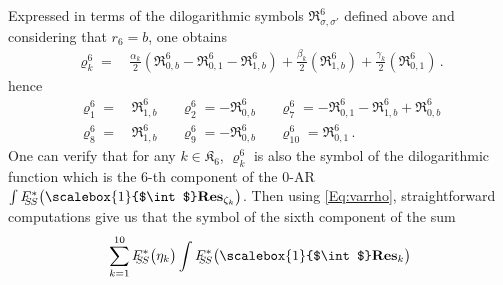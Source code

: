 \documentclass[11pt]{amsart}
\begin{document}
Expressed in terms of the 
dilogarithmic symbols $\mathfrak R^6_{\sigma,\sigma'}$ defined above and considering that $r_6=b$,  one obtains 
\begin{align*}%
\varrho_k^6 = &\, \frac{\alpha_k}{2} \left(
{\mathfrak R}^6_{0,b}
-{\mathfrak R}^6_{0,1}-{\mathfrak R}^6_{1,b}
\right) 
 +
 \frac{\beta_k}{2}  \left(
{\mathfrak R}^6_{1,b}
\right)+
 \frac{\gamma_k}{2}
 \left( 
{\mathfrak R}^6_{0,1}
\right)  \, .
\end{align*}%
hence 
\begin{align}
\label{Eq:varrho}
\varrho^6_1= & \,{\mathfrak R}^6_{1,b}
&& \varrho^6_2=- {\mathfrak R}^6_{0,b}
&& \varrho^6_7=-{\mathfrak R}^6_{0,1}-{\mathfrak R}^6_{1,b}+{\mathfrak R}^6_{0,b} 
\\
\varrho^6_8= & \, {\mathfrak R}^6_{1,b}
&& \varrho^6_9=-{\mathfrak R}^6_{0,b}
&& \varrho^6_{10}={\mathfrak R}^6_{0,1}\, .
\nonumber
%
%
\end{align}
One can verify that for any $k\in {\mathfrak K}_6$,  $\varrho^6_k$ is also the symbol 
of the dilogarithmic function which is the 6-th component of the 0-AR 
$\int F_{\hspace{-0.05cm} 
\hspace{-0.08cm}
S\hspace{-0.03cm}S}^*\big( 
\hspace{-0.0cm}
\scalebox{1}{$\int$}  \hspace{-0.0cm} {\bf Res}_{\zeta_k}\big)$. 
Then using  \eqref{Eq:varrho}, straightforward computations give us that the 
symbol of the sixth component  of the sum 
\begin{equation}
\label{Eq:quasi-la-fin}
\sum_{k=1}^{10} F_{\hspace{-0.05cm} 
\hspace{-0.08cm}
S\hspace{-0.03cm}S}^*
\big(
\eta_k 
\big) 
\int F_{\hspace{-0.05cm} 
\hspace{-0.08cm}
S\hspace{-0.03cm}S}^*\big( 
\hspace{-0.0cm}
\scalebox{1}{$\int$}  \hspace{-0.0cm} {\bf Res}_{k}\big)
\end{equation}
\end{document}
